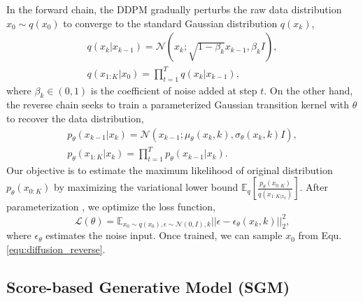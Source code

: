 \documentclass{article} %
\begin{document}
In the forward chain, the DDPM gradually perturbs the raw data distribution $x_0 \sim q(x_0)$ to converge to the standard Gaussian distribution $q(x_k)$,
\begin{equation}
    \begin{gathered}
    q(x_k|x_{k-1})=\mathcal{N}(x_k; \sqrt{1-\beta_k} x_{k-1}, \beta_k I), \\ 
    q(x_{1:K}|x_0)=\prod_{t=1}^T q(x_k|x_{k-1}),
\end{gathered}\label{equ:diffusion_forward}
\end{equation}
where $\beta_k \in (0, 1)$ is the coefficient of noise added at step $t$. On the other hand, the reverse chain seeks to train a parameterized Gaussian transition kernel with $\theta$ to recover the data distribution,
\begin{equation}
    \begin{gathered}
    p_\theta(x_{k-1}|x_k)=\mathcal{N}(x_{k-1}; \mu_\theta(x_k, k), \sigma_\theta(x_k, k)I), \\ 
    p_\theta(x_{1:K}|x_k)=\prod_{t=1}^T p_\theta(x_{k-1}|x_k).
\end{gathered}\label{equ:diffusion_reverse}
\end{equation}
Our objective is to estimate the maximum likelihood of original distribution $p_\theta(x_{0:K})$ by maximizing the variational lower bound $\mathbb{E}_q[\frac{p_\theta(x_{0:K})}{q(x_{1:K|x_0})}]$. After parameterization \cite{hodiffusion}, we optimize the loss function,
\begin{equation}
    \mathcal{L(\theta)} = \mathbb{E}_{x_0 \sim q(x_0), \epsilon \sim \mathcal{N}(0, I), k} \vert \vert\epsilon - \epsilon_
    \theta(x_k, k) \vert \vert ^2_2,
\end{equation}
where $\epsilon_\theta$ estimates the noise input. Once trained, we can sample $x_0$ from Equ. \ref{equ:diffusion_reverse}.

\subsection{Score-based Generative Model (SGM)}
\end{document}
